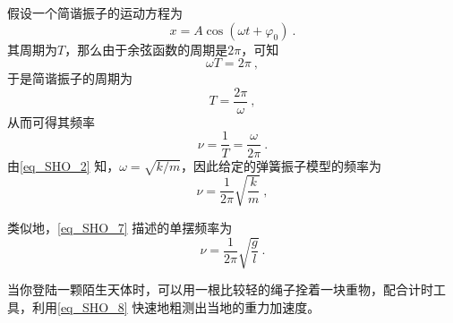 假设一个简谐振子的运动方程为
\begin{equation}
x = A\cos(\omega t+\varphi_0)~.
\end{equation}
其周期为$T$，那么由于余弦函数的周期是$2\pi$，可知
\begin{equation}
\omega T = 2\pi~,
\end{equation}
于是简谐振子的周期为
\begin{equation}\label{eq_SHO_9}
T = \frac{2\pi}{\omega}~,
\end{equation}
从而可得其频率
\begin{equation}
\nu = \frac{1}{T} = \frac{\omega}{2\pi}~.
\end{equation}
由\autoref{eq_SHO_2} 知，$\omega=\sqrt{k/m}$，因此给定的弹簧振子模型的频率为
\begin{equation}
\nu = \frac{1}{2\pi}\sqrt{\frac{k}{m}}~,
\end{equation}

类似地，\autoref{eq_SHO_7} 描述的单摆频率为
\begin{equation}\label{eq_SHO_8}
\nu = \frac{1}{2\pi}\sqrt{\frac{g}{l}}~.
\end{equation}

当你登陆一颗陌生天体时，可以用一根比较轻的绳子拴着一块重物，配合计时工具，利用\autoref{eq_SHO_8} 快速地粗测出当地的重力加速度。













